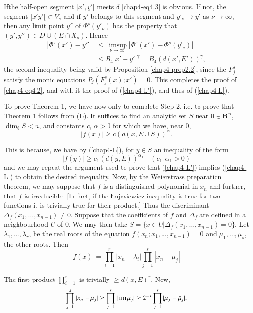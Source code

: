 If\pageoriginale the half-open segment $[x',y'[$ meets $\delta $ \eqref{chap4-eq4.3} is obvious. If not, the segment $[x' y'[ \subset V_s$ and if $y'$ belongs to this segment and $y'_{\nu} \to y'$ as $\nu \to \infty$, then any limit point $y''$ of $\Phi^s (y'_\nu)$ has the property that $(y', y'') \in D \cup (E \cap X_s)$. Hence
\begin{align*}
  |\Phi^s (x') - y''| & \leq  {\displaystyle\mathop{\lim\sup}_{\nu \to \infty}} |\Phi^s (x') - \Phi^s (y'_\nu)|\\
  & \leq B_4 |x' - y'|^\gamma = B_4 (d (x', E'))^\gamma,
\end{align*}
the  second inequality being valid by Proposition \ref{chap4-prop2.2}, since the $F^s_j$ satisfy the monic equations $P_j (F^s_j (x); x' ) =0$. This completes the proof of \eqref{chap4-eq4.2}, and with it the proof of (\ref{chap4-L'}), and thus of (\ref{chap4-L}).

To prove Theorem 1, we have now only to complete Step 2, i.e. to prove that Theorem 1 follows from (L). It suffices to find an analytic set $S$ near $0 \in \mathbf{R}^n$, $\dim_0 S < n$, and constants $c$, $\alpha >0$ for which we have, near 0,
$$
|f(x)| \geq c (d (x, E \cup S))^\alpha.
$$

This is because, we have by (\ref{chap4-L}), for $y \in S$ an inequality of the form
$$
|f(y)| \geq c_1 (d(y, E))^{\alpha_1} \quad (c_1, \alpha_1 > 0)
$$
and we may repeat the argument used to prove that (\ref{chap4-L'}) implies (\ref{chap4-L}) to obtain the desired inequality. Now, by the Weierstrass preparation theorem, we may suppose that $f$ is a distinguished polynomial in $x_n$ and further, that $f$ is irreducible. [In fact, if the \L ojasiewicz inequality is true for two functions it is trivially true for their product.] Thus the discriminant $\Delta_f (x_1, \ldots, x_{n-1}) \neq 0$. Suppose that the coefficients of $f$ and $\Delta_f$ are defined in a neighbourhood $U$ of 0. We may then take $S = \{x \in U | \Delta_f (x_1, \ldots, x_{n-1}) = 0\}$. Let $\lambda_1, \ldots, \lambda_r$, be the real roots of the equation $f(x_n ; x_1, \ldots, x_{n-1}) =0$ and $\mu_1, \ldots, \mu_s$, the other roots. Then
$$
|f(x)| = \prod\limits^r_{i=1} |x_n - \lambda_i| \prod\limits^s_{j=1} |x_n - \mu_j|.
$$

The first product $\prod\limits^r_{i=1}$ is trivially $\geq d (x, E)^r$. Now,
$$
\prod\limits^s_{j=1} |x_n - \mu_j| \geq \prod\limits^s_{j=1} |\operatorname{im} \mu_j| \geq 2^{-s} \prod\limits^s_{j=1} |\mu_j - \bar{\mu}_j|.
$$

\eject

